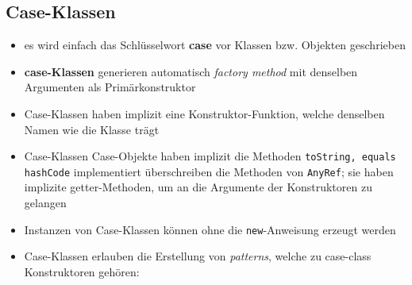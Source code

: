\subsection{Case-Klassen}
\begin{itemize}
  \item es wird einfach das Schlüsselwort \textbf{case} vor Klassen bzw. 
  Objekten geschrieben
  \item \textbf{case-Klassen} generieren automatisch 
  \textit{factory method} mit denselben Argumenten als Primärkonstruktor
  \item Case-Klassen haben implizit eine Konstruktor-Funktion, 
  welche denselben Namen wie die Klasse trägt
  \item Case-Klassen \und Case-Objekte haben implizit die Methoden
  \texttt{toString, equals} \und \texttt{hashCode} implementiert \und 
  überschreiben die Methoden von \texttt{AnyRef}; sie haben implizite 
  getter-Methoden, um an die Argumente der Konstruktoren zu gelangen
  \item Instanzen von Case-Klassen können ohne die \texttt{new}-Anweisung
  erzeugt werden
  
    
  
  \item Case-Klassen erlauben die Erstellung von \textit{patterns}, welche
  zu case-class Konstruktoren gehören:
  
  
  
\end{itemize}


